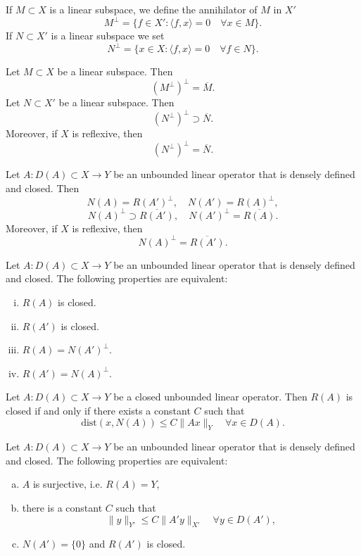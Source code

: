 \begin{defn}
If $M\subset X$ is a linear subspace,  we define the annihilator of $M$ in $X'$
\[
M^{\perp}=\{f\in X': \langle f, x\rangle=0\quad \forall x\in M\}.
\]
If $N\subset X'$ is a linear subspace we set
\[
N^{\perp}=\{x\in X: \langle f, x\rangle=0\quad \forall f\in N\}.
\]
\end{defn}

\begin{lemma}
Let $M\subset X$ be a linear subspace. Then
\[
(M^{\perp})^{\perp}=\overline{M}.
\]
Let $N\subset X'$ be a linear subspace. Then
\[
(N^{\perp})^{\perp}\supset\overline{N}.
\]
Moreover, if $X$ is reflexive, then
\[
(N^{\perp})^{\perp}=\overline{N}.
\]
\end{lemma}

\begin{theorem}
Let $A: D(A)\subset X\to Y$ be an unbounded linear operator that is densely defined and closed. Then
\[
N(A)=R(A')^{\perp},
\quad
N(A')=R(A)^{\perp},
\]
\[
N(A)^{\perp}\supset \overline{R(A')},
\quad
N(A')^{\perp}= \overline{R(A)}.
\]
Moreover, if $X$ is reflexive, then
\[
N(A)^{\perp}= \overline{R(A')}.
\]
\end{theorem}

\begin{theorem}
Let $A: D(A)\subset X\to Y$ be an unbounded linear operator that is densely defined and closed. The following properties are equivalent:
\begin{enumerate}[(i)]
\item $R(A)$ is closed.
\item $R(A')$ is closed.
\item $R(A)=N(A')^{\perp}$.
\item $R(A')=N(A)^{\perp}$.
\end{enumerate}
\end{theorem}

\begin{theorem}
Let $A: D(A)\subset X\to Y$ be a closed unbounded linear operator. Then $R(A)$ is closed if and only if there exists a constant $C$ such that
\[
\textrm{dist}(x, N(A))\leq C\|Ax\|_Y\quad \forall x\in D(A).
\]
\end{theorem}

\begin{theorem}
Let $A: D(A)\subset X\to Y$ be an unbounded linear operator that is densely defined and closed. The following properties are equivalent:
\begin{enumerate}[(a)]
\item $A$ is surjective, i.e. $R(A)=Y$,
\item there is a constant $C$ such that
\[
\|y\|_{Y'}\leq C\|A'y\|_{X'}\quad \forall y\in D(A'),
\]
\item $N(A')=\{0\}$ and $R(A')$ is closed.
\end{enumerate}
\end{theorem}

